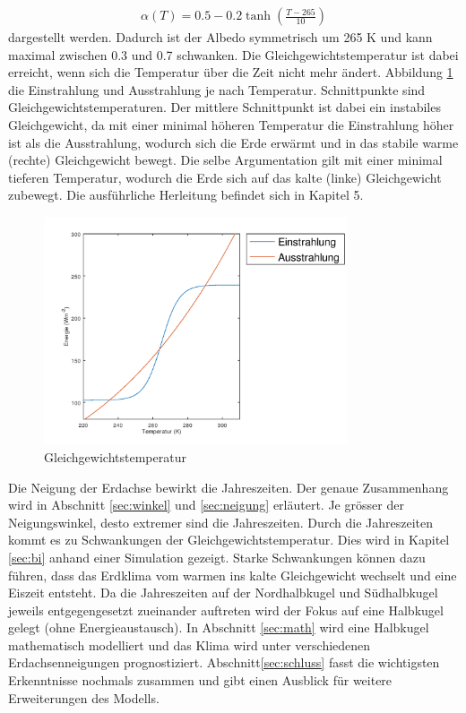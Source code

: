 \begin{refsection}
\begin{eqnarray} 
\alpha(T) = 0.5 - 0.2 \tanh \left( \frac{T-265}{10} \right) 
\end{eqnarray}
dargestellt werden. Dadurch ist der Albedo symmetrisch um 265 K und kann maximal zwischen 0.3 und 0.7 schwanken. Die Gleichgewichtstemperatur ist dabei erreicht, wenn sich die Temperatur über die Zeit nicht mehr ändert. Abbildung \ref{fig:abb1} die Einstrahlung und Ausstrahlung je nach Temperatur. Schnittpunkte sind Gleichgewichtstemperaturen. Der mittlere Schnittpunkt ist dabei ein instabiles Gleichgewicht, da mit einer minimal höheren Temperatur die Einstrahlung höher ist als die Ausstrahlung, wodurch sich die Erde erwärmt und in das stabile warme (rechte) Gleichgewicht bewegt. Die selbe Argumentation gilt mit einer minimal tieferen Temperatur, wodurch die Erde sich auf das kalte (linke) Gleichgewicht zubewegt. Die ausführliche Herleitung befindet sich in Kapitel 5.
%
\begin{figure}
	\centering
	\includegraphics[width= 0.8\textwidth]{neigung/Strahlung_1.png}
	\caption[Gleichgewichtstemperatur]{Gleichgewichtstemperatur}
	\label{fig:abb1}
\end{figure}
%
Die Neigung der Erdachse bewirkt die Jahreszeiten. Der genaue Zusammenhang wird in Abschnitt \ref{sec:winkel} und \ref{sec:neigung} erläutert. Je grösser der Neigungswinkel, desto extremer sind die Jahreszeiten. Durch die Jahreszeiten kommt es zu Schwankungen der Gleichgewichtstemperatur. Dies wird in Kapitel \ref{sec:bi} anhand einer Simulation gezeigt. Starke Schwankungen können dazu führen, dass das Erdklima vom warmen ins kalte Gleichgewicht wechselt und eine Eiszeit entsteht. Da die Jahreszeiten auf der Nordhalbkugel und Südhalbkugel jeweils entgegengesetzt zueinander auftreten wird der Fokus auf eine Halbkugel gelegt (ohne Energieaustausch). In Abschnitt \ref{sec:math} wird eine Halbkugel mathematisch modelliert und das Klima wird unter verschiedenen Erdachsenneigungen prognostiziert. Abschnitt\ref{sec:schluss} fasst die wichtigsten Erkenntnisse nochmals zusammen und gibt einen Ausblick für weitere Erweiterungen des Modells.


\end{refsection}
